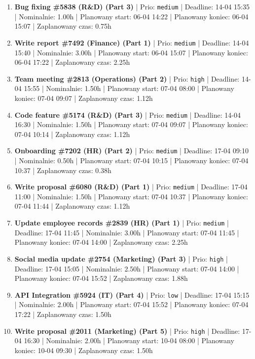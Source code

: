 {\begin{enumerate}
  \item [\textbf{14637}] \textbf{Bug fixing \#5838 (R\&D) (Part 3)} | Prio: \texttt{medium} | Deadline: 14-04 15:35 | Nominalnie: 1.00h | Planowany start: 06-04 14:22 | Planowany koniec: 06-04 15:07 | Zaplanowany czas: 0.75h
  \item [\textbf{14642}] \textbf{Write report \#7492 (Finance) (Part 1)} | Prio: \texttt{medium} | Deadline: 14-04 15:40 | Nominalnie: 3.00h | Planowany start: 06-04 15:07 | Planowany koniec: 06-04 17:22 | Zaplanowany czas: 2.25h
  \item [\textbf{14617}] \textbf{Team meeting \#2813 (Operations) (Part 2)} | Prio: \texttt{high} | Deadline: 14-04 15:55 | Nominalnie: 1.50h | Planowany start: 07-04 08:00 | Planowany koniec: 07-04 09:07 | Zaplanowany czas: 1.12h
  \item [\textbf{14646}] \textbf{Code feature \#5174 (R\&D) (Part 3)} | Prio: \texttt{medium} | Deadline: 14-04 16:30 | Nominalnie: 1.50h | Planowany start: 07-04 09:07 | Planowany koniec: 07-04 10:14 | Zaplanowany czas: 1.12h
  \item [\textbf{14648}] \textbf{Onboarding \#7202 (HR) (Part 2)} | Prio: \texttt{medium} | Deadline: 17-04 09:10 | Nominalnie: 0.50h | Planowany start: 07-04 10:15 | Planowany koniec: 07-04 10:37 | Zaplanowany czas: 0.38h
  \item [\textbf{14669}] \textbf{Write proposal \#6080 (R\&D) (Part 1)} | Prio: \texttt{medium} | Deadline: 17-04 11:00 | Nominalnie: 1.50h | Planowany start: 07-04 10:37 | Planowany koniec: 07-04 11:44 | Zaplanowany czas: 1.12h
  \item [\textbf{14670}] \textbf{Update employee records \#2839 (HR) (Part 1)} | Prio: \texttt{medium} | Deadline: 17-04 11:45 | Nominalnie: 3.00h | Planowany start: 07-04 11:45 | Planowany koniec: 07-04 14:00 | Zaplanowany czas: 2.25h
  \item [\textbf{14611}] \textbf{Social media update \#2754 (Marketing) (Part 3)} | Prio: \texttt{high} | Deadline: 17-04 15:05 | Nominalnie: 2.50h | Planowany start: 07-04 14:00 | Planowany koniec: 07-04 15:52 | Zaplanowany czas: 1.88h
  \item [\textbf{14696}] \textbf{API Integration \#5924 (IT) (Part 4)} | Prio: \texttt{low} | Deadline: 17-04 15:15 | Nominalnie: 2.00h | Planowany start: 07-04 15:52 | Planowany koniec: 07-04 17:22 | Zaplanowany czas: 1.50h
  \item [\textbf{14628}] \textbf{Write proposal \#2011 (Marketing) (Part 5)} | Prio: \texttt{high} | Deadline: 17-04 16:30 | Nominalnie: 2.00h | Planowany start: 10-04 08:00 | Planowany koniec: 10-04 09:30 | Zaplanowany czas: 1.50h

\end{enumerate}}
